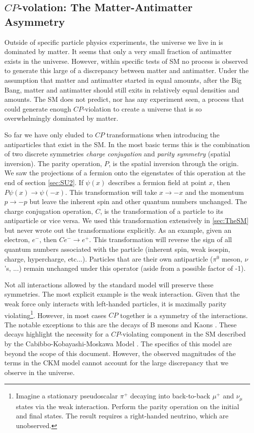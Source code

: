 \subsection{$CP$-volation: The Matter-Antimatter Asymmetry}
\label{sec:CPviolation}

Outside of specific particle physics experiments, the universe we live in is dominated by matter. It seems that only a very small fraction of antimatter exists in the universe. However, within specific tests of SM no process is observed to generate this large of a discrepancy between matter and antimatter. Under the assumption that matter and antimatter started in equal amounts, after the Big Bang, matter and antimatter should still exits in relatively equal densities and amounts. The SM does not predict, nor has any experiment seen, a process that could generate enough $CP$-violation to create a universe that is so overwhelmingly dominated by matter.

So far we have only eluded to $CP$ transformations when introducing the antiparticles that exist in the SM. In the most basic terms this is the combination of two discrete symmetries \textit{charge conjugation} and \textit{parity symmetry} (spatial inversion). The parity operation, $P$, is the spatial inversion through the origin. We saw the projections of a fermion onto the eigenstates of this operation at the end of section \ref{sec:SU2}. If $\psi\left(x\right)$ describes a fermion field at point $x$, then $P\psi\left(x\right) \to \psi\left(-x\right)$. This transformation will take $x \to -x$ and the momentum $p \to -p$ but leave the inherent spin and other quantum numbers unchanged. The charge conjugation operation, $C$, is the transformation of a particle to its antiparticle or vice versa. We used this transformation extensively in \ref{sec:TheSM} but never wrote out the transformations explicitly. As an example, given an electron, $e^{-}$, then $Ce^{-} \to e^{+}$. This transformation will reverse the sign of all quantum numbers associated with the particle (inherent spin, weak isospin, charge, hypercharge, etc...). Particles that are their own antiparticle ($\pi^0$ meson, $\nu$'s, ...) remain unchanged under this operator (aside from a possible factor of -1).

Not all interactions allowed by the standard model will preserve these symmetries. The most explicit example is the weak interaction. Given that the weak force only interacts with left-handed particles, it is maximally parity violating\footnote{Imagine a stationary pseudoscalar $\pi^{+}$ decaying into back-to-back $\mu^{+}$ and $\nu_{\mu}$ states via the weak interaction. Perform the parity operation on the initial and final states. The result requires a right-handed neutrino, which are unobserved.}. However, in most cases $CP$ together is a symmetry of the interactions. The notable exceptions to this are the decays of B mesons and Kaons \cite{Agashe:2014kda}. These decays highlight the necessity for a $CP$-violating component in the SM described by the Cabibbo-Kobayashi-Moskawa Model \cite{Kobayashi:1973fv}. The specifics of this model are beyond the scope of this document. However, the observed magnitudes of the terms in the CKM model cannot account for the large discrepancy that we observe in the universe.

